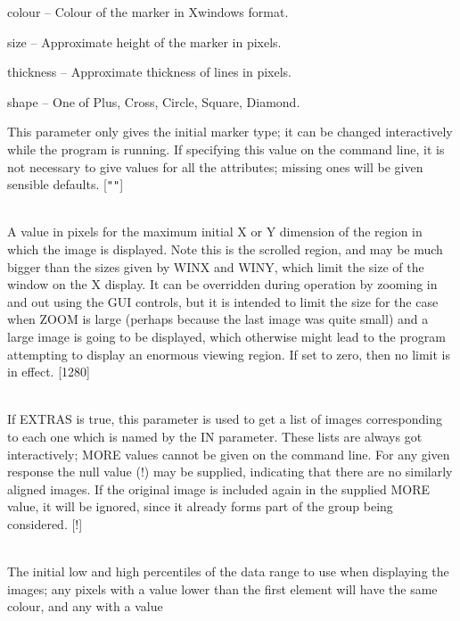 \documentclass[twoside,11pt]{article}
\renewcommand{\_}{\texttt{\symbol{95}}}
\newcommand{\sstsubsection}[1]{ \item[{#1}] \mbox{} \\}
\newcommand{\sstitem}{\item}
\newcommand{\sstsubsection}[1]{\item[{#1}]}
\newcommand{\sstitem}{\item}
\begin{document}
{{{{            \sstitem
               colour     -- Colour of the marker in Xwindows format.

            \sstitem
               size       -- Approximate height of the marker in pixels.

            \sstitem
               thickness  -- Approximate thickness of lines in pixels.

            \sstitem
               shape      -- One of Plus, Cross, Circle, Square, Diamond.

         }
         This parameter only gives the initial marker type; it can be
         changed interactively while the program is running.
         If specifying this value on the command line, it is not
         necessary to give values for all the attributes; missing ones
         will be given sensible defaults.
         [{\tt "}{\tt "}]
      }
      \sstsubsection{
         MAXCANV = INTEGER (Read and Write)
      }{
         A value in pixels for the maximum initial X or Y dimension of
         the region in which the image is displayed.  Note this is the
         scrolled region, and may be much bigger than the sizes given
         by WINX and WINY, which limit the size of the window on the
         X display.  It can be overridden during operation by zooming
         in and out using the GUI controls, but it is intended to
         limit the size for the case when ZOOM is large (perhaps
         because the last image was quite small) and a large image
         is going to be displayed, which otherwise might lead to
         the program attempting to display an enormous viewing region.
         If set to zero, then no limit is in effect.
         [1280]
      }
      \sstsubsection{
         MORE = LITERAL (Read)
      }{
         If EXTRAS is true, this parameter is used to get a list of
         images corresponding to each one which is named by the IN
         parameter.  These lists are always got interactively; MORE
         values cannot be given on the command line.  For any given
         response the null value (!) may be supplied, indicating that
         there are no similarly aligned images.  If the original image
         is included again in the supplied MORE value, it will be
         ignored, since it already forms part of the group being
         considered.
         [!]
      }
      \sstsubsection{
         PERCENTILES( 2 ) = \_DOUBLE (Read)
      }{
         The initial low and high percentiles of the data range to use
         when displaying the images; any pixels with a value lower than
         the first element will have the same colour, and any with a value
}}}
\end{document}

